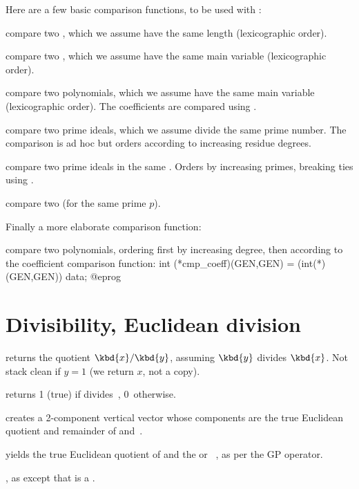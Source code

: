 Here are a few basic comparison functions, to be used with :

 compare two , which we assume have
the same length (lexicographic order).

 compare two , which we assume
have the same main variable (lexicographic order).

 compare two polynomials, which we assume
have the same main variable (lexicographic order). The coefficients are
compared using .

 compare two prime ideals, which
we assume divide the same prime number. The comparison is ad hoc but orders
according to increasing residue degrees.

 compare two prime ideals in the same
. Orders by increasing primes, breaking ties using
.

 compare two  (for the same
prime $p$).

Finally a more elaborate comparison function:

 compare two polynomials,
ordering first by increasing degree, then according to the coefficient
comparison function:
\bprog
  int (*cmp_coeff)(GEN,GEN) = (int(*)(GEN,GEN)) data;
@eprog

\section{Divisibility, Euclidean division}

 returns the quotient $\kbd{x} / \kbd{y}$,
assuming $\kbd{y}$ divides $\kbd{x}$. Not stack clean if $y = 1$
(we return $x$, not a copy).

  returns 1 (true) if  divides~,
0~otherwise.

 creates a 2-component vertical
vector whose components are the true Euclidean quotient and remainder
of  and~.

 yields the true Euclidean
quotient of  and the  or ~, as per
the \kbd{\bs} GP operator.

, as 
except that  is a .


